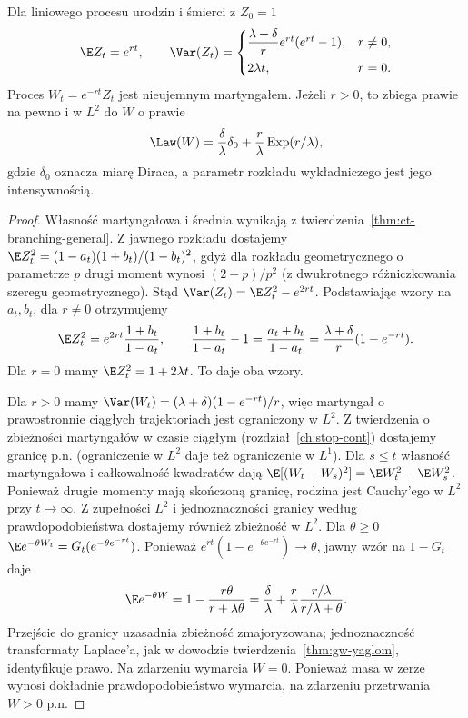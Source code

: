 \begin{wniosek}
Dla liniowego procesu urodzin i śmierci z $Z_0=1$
\[
\E Z_t=e^{rt},\qquad
\Var(Z_t)=
\begin{cases}
\dfrac{\lambda+\delta}{r}e^{rt}(e^{rt}-1),&r\ne0,\\[6pt]
2\lambda t,&r=0 .
\end{cases}
\]
Proces $W_t=e^{-rt}Z_t$ jest nieujemnym martyngałem.
Jeżeli $r>0$, to zbiega prawie na pewno i w $L^2$
do $W$ o prawie
\[
\Law(W)=\frac{\delta}{\lambda}\delta_0+
\frac r\lambda\,\mathrm{Exp}(r/\lambda),
\]
gdzie $\delta_0$ oznacza miarę Diraca, a parametr
rozkładu wykładniczego jest jego intensywnością.
\end{wniosek}
\begin{proof}
Własność martyngałowa i średnia wynikają
z twierdzenia~\ref{thm:ct-branching-general}.
Z jawnego rozkładu dostajemy
$\E Z_t^2=(1-a_t)(1+b_t)/(1-b_t)^2$,
gdyż dla rozkładu geometrycznego o parametrze
$p$ drugi moment wynosi $(2-p)/p^2$
(z dwukrotnego różniczkowania szeregu
geometrycznego).
Stąd $\Var(Z_t)=\E Z_t^2-e^{2rt}$.
Podstawiając wzory na $a_t,b_t$, dla $r\ne0$
otrzymujemy
\[
\E Z_t^2=e^{2rt}\frac{1+b_t}{1-a_t},
\qquad
\frac{1+b_t}{1-a_t}-1
=\frac{a_t+b_t}{1-a_t}
=\frac{\lambda+\delta}{r}(1-e^{-rt}).
\]
Dla $r=0$ mamy $\E Z_t^2=1+2\lambda t$.
To daje oba wzory.

Dla $r>0$ mamy
$\Var(W_t)=(\lambda+\delta)(1-e^{-rt})/r$,
więc martyngał o prawostronnie ciągłych trajektoriach
jest ograniczony w $L^2$.
Z twierdzenia o zbieżności martyngałów w czasie
ciągłym (rozdział~\ref{ch:stop-cont}) dostajemy
granicę p.n. (ograniczenie w $L^2$ daje też
ograniczenie w $L^1$).
Dla $s\le t$ własność martyngałowa i całkowalność
kwadratów dają
$\E[(W_t-W_s)^2]=\E W_t^2-\E W_s^2$.
Ponieważ drugie momenty mają skończoną granicę,
rodzina jest Cauchy'ego w $L^2$ przy $t\to\infty$.
Z zupełności $L^2$ i jednoznaczności granicy
według prawdopodobieństwa dostajemy również
zbieżność w $L^2$. Dla $\theta\ge0$
$\E e^{-\theta W_t}=G_t(e^{-\theta e^{-rt}})$.
Ponieważ $e^{rt}(1-e^{-\theta e^{-rt}})\to\theta$,
jawny wzór na $1-G_t$ daje
\[
\E e^{-\theta W}
=1-\frac{r\theta}{r+\lambda\theta}
=\frac{\delta}{\lambda}
+\frac r\lambda\frac{r/\lambda}{r/\lambda+\theta}.
\]
Przejście do granicy uzasadnia zbieżność
zmajoryzowana; jednoznaczność transformaty
Laplace'a, jak w dowodzie
twierdzenia~\ref{thm:gw-yaglom}, identyfikuje prawo.
Na zdarzeniu wymarcia $W=0$. Ponieważ masa w zerze
wynosi dokładnie prawdopodobieństwo wymarcia,
na zdarzeniu przetrwania $W>0$ p.n.
\end{proof}

